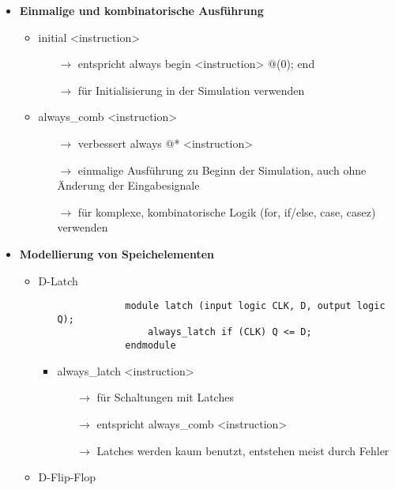\begin{itemize}
\item \textbf{Einmalige und kombinatorische Ausführung}
	\begin{itemize}
	\item initial <instruction>
		\begin{itemize}
		\item[$\rightarrow$] entspricht always begin <instruction> @(0); end
		\item[$\rightarrow$] für Initialisierung in der Simulation verwenden
		\end{itemize}
	\item always\_comb <instruction> 
		\begin{itemize}
		\item[$\rightarrow$] verbessert always @* <instruction>
 		\item[$\rightarrow$] einmalige Ausführung zu Beginn der Simulation, auch ohne Änderung der Eingabesignale
 		\item[$\rightarrow$] für komplexe, kombinatorische Logik (for, if/else, case, casez) verwenden
		\end{itemize}
	\end{itemize}

\pagebreak

\item \textbf{Modellierung von Speichelementen}
	\begin{itemize}
	
	\item D-Latch
		\begin{itemize}
		\item[]
			\begin{lstlisting}
			module latch (input logic CLK, D, output logic Q);
				always_latch if (CLK) Q <= D;
			endmodule			
			\end{lstlisting}
		\item always\_latch <instruction>
			\begin{itemize}
			\item[$\rightarrow$] für Schaltungen mit Latches
			\item[$\rightarrow$] entspricht always\_comb <instruction>
			\item[$\rightarrow$] Latches werden kaum benutzt, entstehen meist durch Fehler
			\end{itemize}
		\end{itemize}
	
	\item D-Flip-Flop
		\begin{itemize}
		

\end{itemize}
\end{itemize}
\end{itemize}
